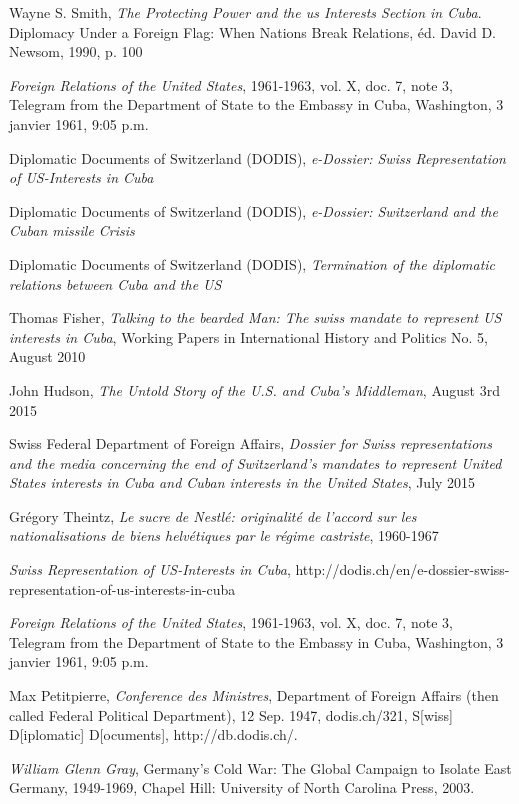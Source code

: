 \documentclass[a4paper]{article}
\begin{document}
\begin{thebibliography}{9}
Wayne S. Smith, \emph{The Protecting Power and the us Interests Section in Cuba}. Diplomacy Under a Foreign Flag: When Nations Break Relations, \'ed. David D. Newsom, 1990, p. 100

\emph{Foreign Relations of the United States}, 1961-1963, vol. X, doc. 7, note 3, Telegram from the Department of State to the Embassy in Cuba, Washington, 3 janvier 1961, 9:05 p.m.

Diplomatic Documents of Switzerland (DODIS), \emph{e-Dossier: Swiss Representation of US-Interests in Cuba}

Diplomatic Documents of Switzerland (DODIS), \emph{e-Dossier: Switzerland and the Cuban missile Crisis}

Diplomatic Documents of Switzerland (DODIS), \emph{Termination of the diplomatic relations between Cuba and the US}

Thomas Fisher, \emph{Talking to the bearded Man: The swiss mandate to represent US interests in Cuba}, Working Papers in International History and Politics No. 5, August 2010

John Hudson, \emph{The Untold Story of the U.S. and Cuba’s Middleman}, August 3rd 2015

Swiss Federal Department of Foreign Affairs, \emph{Dossier for Swiss representations and the media concerning the end of Switzerland’s mandates to represent United States interests in Cuba and Cuban interests in the United States}, July 2015


Grégory Theintz, \emph{Le sucre de Nestl\'e: originalité de l'accord sur les nationalisations de biens helvétiques par le régime castriste}, 1960-1967

\emph{Swiss Representation of US-Interests in Cuba}, http://dodis.ch/en/e-dossier-swiss-representation-of-us-interests-in-cuba

\emph{Foreign Relations of the United States}, 1961-1963, vol. X, doc. 7, note 3, Telegram from the Department of State to the Embassy in Cuba, Washington, 3 janvier 1961, 9:05 p.m.




Max Petitpierre, \emph{Conference des Ministres}, Department of Foreign Affairs (then called Federal Political Department), 12 Sep. 1947, dodis.ch/321, S[wiss] D[iplomatic] D[ocuments], http://db.dodis.ch/.

\emph{William Glenn Gray}, Germany’s Cold War: The Global Campaign to Isolate East Germany, 1949-1969, Chapel Hill: University of North Carolina Press, 2003.


\end{thebibliography}
\end{document}
